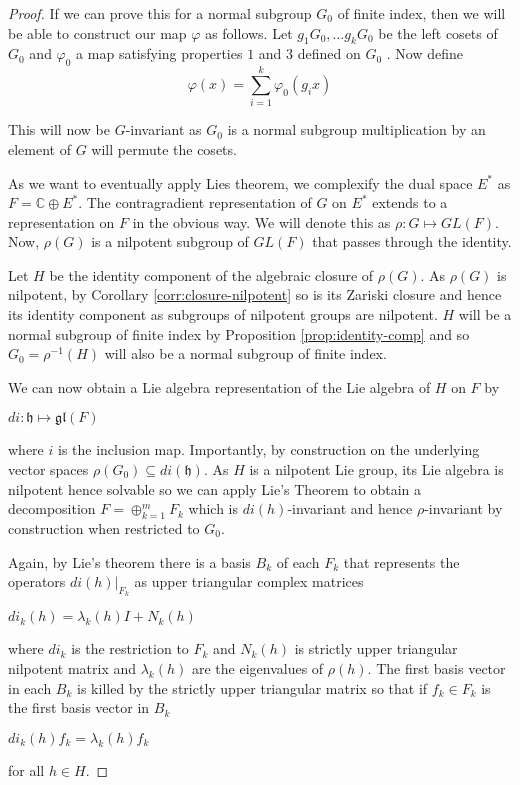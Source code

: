 \begin{proof}
    If we can prove this for a normal subgroup $G_0$ of finite index, then we will be able to construct our map $\varphi$ as follows.
    Let $g_1G_0, \dots g_kG_0$ be the left cosets of $G_0$ and $\varphi_0$ a map satisfying properties $1$ and $3$ defined on $G_0$ .
    Now define
    $$\varphi(x) = \sum^{k}_{i=1} \varphi_0(g_ix)$$

    This will now be $G$-invariant as $G_0$ is a normal subgroup multiplication by
    an element of $G$ will permute the cosets.

    As we want to eventually apply Lies theorem, we complexify the dual space $E^*$
    as $F = \mathbb{C}\oplus E^*$. The contragradient representation of $G$ on
    $E^*$ extends to a representation on $F$ in the obvious way. We will denote
    this as $\rho : G \mapsto GL(F)$. Now, $\rho(G)$ is a nilpotent subgroup of
    $GL(F)$ that passes through the identity.

    Let $H$ be the identity component of the algebraic closure of $\rho(G)$. As
    $\rho(G)$ is nilpotent, by Corollary \ref{corr:closure-nilpotent} so is its
    Zariski closure and hence its identity component as subgroups of nilpotent
    groups are nilpotent. $H$ will be a normal subgroup of finite index by
    Proposition \ref{prop:identity-comp} and so $G_0 = \rho^{-1}(H)$ will also be a
    normal subgroup of finite index.

    We can now obtain a Lie algebra representation of the Lie algebra of $H$ on $F$
    by
    \begin{center}
        $di: \mathfrak{h} \mapsto \mathfrak{gl}(F)$
    \end{center}
    where $i$ is the inclusion map. Importantly, by construction on the underlying vector spaces $\rho(G_0) \subseteq di(\mathfrak{h})$. As $H$ is a nilpotent Lie group, its Lie algebra is nilpotent hence solvable so we can
    apply Lie's Theorem to obtain a decomposition $F = \oplus^m_{k=1} F_k$ which is $di(h)$-invariant and hence $\rho$-invariant by
    construction when restricted to $G_0$.

    Again, by Lie's theorem there is a basis $B_k$ of each $F_k$ that represents
    the operators $di(h)|_{F_k}$ as upper triangular complex matrices
    \begin{center}
        $di_k(h) = \lambda_k(h)I + N_k(h)$
    \end{center}
    where $di_k$ is the restriction to $F_k$ and $N_k(h)$ is strictly upper triangular nilpotent matrix and $\lambda_k(h)$ are the eigenvalues of $\rho(h)$.
    The first basis vector in each $B_k$ is killed by the strictly upper triangular matrix so that if $f_k\in F_k$ is the
    first basis vector in $B_k$
    \begin{center}
        $di_k(h)f_k = \lambda_k(h)f_k$
    \end{center}
    for all $h \in H$.


\end{proof}
